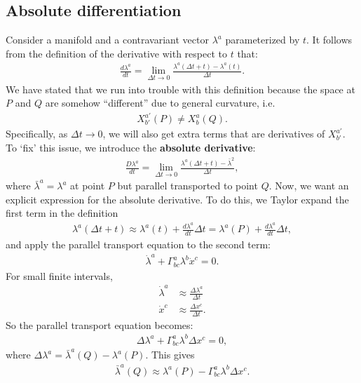 \documentclass{book}
\theoremstyle{definition}
\begin{document}
\subsection{Absolute differentiation}
Consider a manifold and a contravariant vector $\lambda^a$ parameterized by $t$. It follows from the definition of the derivative with respect to $t$ that:
\begin{align*}
\frac{d\lambda^a}{dt} = \lim\limits_{\Delta t \rightarrow 0} \frac{\lambda^a(\Delta t+t) - \lambda^a(t)}{\Delta t}.
\end{align*}
We have stated that we run into trouble with this definition because the space at $P$ and $Q$ are somehow ``different'' due to general curvature, i.e.
\begin{align*}
X^{a'}_{b'}(P) \neq X^{a}_{b}(Q).
\end{align*}
Specifically, as $\Delta t \rightarrow 0$, we will also get extra terms that are derivatives of $X^{a'}_{b'}$. To `fix' this issue, we introduce the \textbf{absolute derivative}:
\begin{align*}
\frac{D\lambda^a}{dt} = \lim\limits_{\Delta t \rightarrow 0}\frac{\lambda^a(\Delta t + t) - \bar{\lambda}^2}{\Delta t},
\end{align*}
where $\bar{\lambda}^a = \lambda^a$ at point $P$ but parallel transported to point $Q$. Now, we want an explicit expression for the absolute derivative. To do this, we Taylor expand the first term in the definition
\begin{align*}
\lambda^a(\Delta t + t) \approx \lambda^a(t) + \frac{d\lambda^a}{dt}\Delta t = \lambda^a(P) + \frac{d\lambda^a}{dt}\Delta t,
\end{align*}
and apply the parallel transport equation to the second term:
\begin{align*}
\dot{\lambda}^a + \Gamma^a_{bc}\lambda^b\dot{x}^c = 0.
\end{align*}
For small finite intervals, 
\begin{align*}
\dot{\lambda}^a &\approx \frac{\Delta \lambda^a}{\Delta t}\\
\dot{x}^c &\approx \frac{\Delta x^c}{\Delta t}.
\end{align*}
So the parallel transport equation becomes:
\begin{align*}
\Delta \lambda^a + \Gamma^a_{bc}\lambda^b\Delta x^c = 0,
\end{align*}
where $\Delta \lambda^a = \bar{\lambda}^a(Q) - \lambda^a(P)$. This gives
\begin{align*}
\bar{\lambda}^a(Q) \approx \lambda^a(P) - \Gamma^a_{bc}\lambda^b\Delta x^c.
\end{align*}
\end{document}
